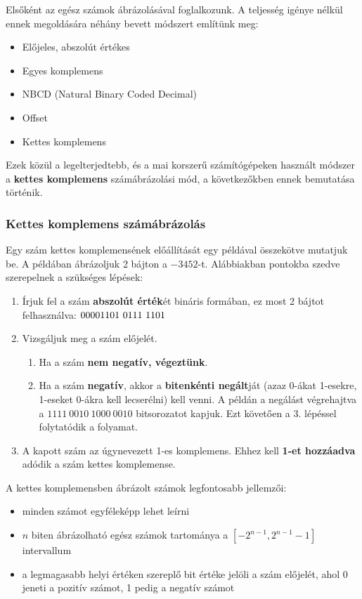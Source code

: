 Elsőként az egész számok ábrázolásával foglalkozunk. A teljesség igénye nélkül ennek megoldására néhány bevett módszert említünk meg:

\begin{itemize}
  \item Előjeles, abszolút értékes
  \item Egyes komplemens
  \item NBCD (Natural Binary Coded Decimal)
  \item Offset
  \item Kettes komplemens
\end{itemize}

Ezek közül a legelterjedtebb, és a mai korszerű számítógépeken használt módszer a \textbf{kettes komplemens} számábrázolási mód, a következőkben ennek bemutatása történik.

\subsubsection{Kettes komplemens számábrázolás}
Egy szám kettes komplemensének előállítását egy példával összekötve mutatjuk be.
A példában ábrázoljuk 2 bájton a $-3452$-t. Alábbiakban pontokba szedve szerepelnek a szükséges lépések:
\begin{enumerate}
  \item Írjuk fel a szám \textbf{abszolút érték}ét bináris formában, ez most 2 bájtot felhasználva: $0000\\ 1101\ 0111\ 1101$
  \item Vizsgáljuk meg a szám előjelét. 
  \begin{enumerate}[label=\alph*)]
    \item Ha a szám \textbf{nem negatív, végeztünk}.
    \item Ha a szám \textbf{negatív}, akkor a \textbf{bitenkénti negált}ját (azaz 0-ákat 1-esekre, 1-eseket 0-ákra kell lecserélni) kell venni. A példán a negálást végrehajtva a 
    $1111\ 0010\ 1000\ 0010$ bitsorozatot kapjuk. Ezt követően a 3. lépéssel folytatódik a folyamat.
  \end{enumerate}
  
  \item A kapott szám az úgynevezett 1-es komplemens. Ehhez kell \textbf{1-et hozzáadva} adódik a szám kettes komplemense.
   
\end{enumerate}
 A kettes komplemensben ábrázolt számok legfontosabb jellemzői:
 \begin{itemize}
  \item minden számot egyféleképp lehet leírni
  \item $n$ biten ábrázolható egész számok tartománya a $[-2^{n-1},2^{n-1}-1]$ intervallum
  \item a legmagasabb helyi értéken szereplő bit értéke jelöli a szám előjelét, ahol 0 jeneti a pozitív számot, 1 pedig a negatív számot
\end{itemize}

